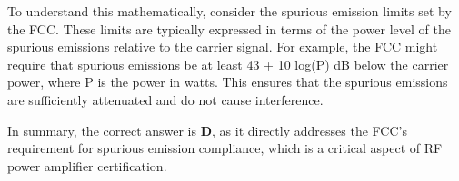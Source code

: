 To understand this mathematically, consider the spurious emission limits set by the FCC. These limits are typically expressed in terms of the power level of the spurious emissions relative to the carrier signal. For example, the FCC might require that spurious emissions be at least 43 + 10 log(P) dB below the carrier power, where P is the power in watts. This ensures that the spurious emissions are sufficiently attenuated and do not cause interference.

In summary, the correct answer is \textbf{D}, as it directly addresses the FCC’s requirement for spurious emission compliance, which is a critical aspect of RF power amplifier certification.

